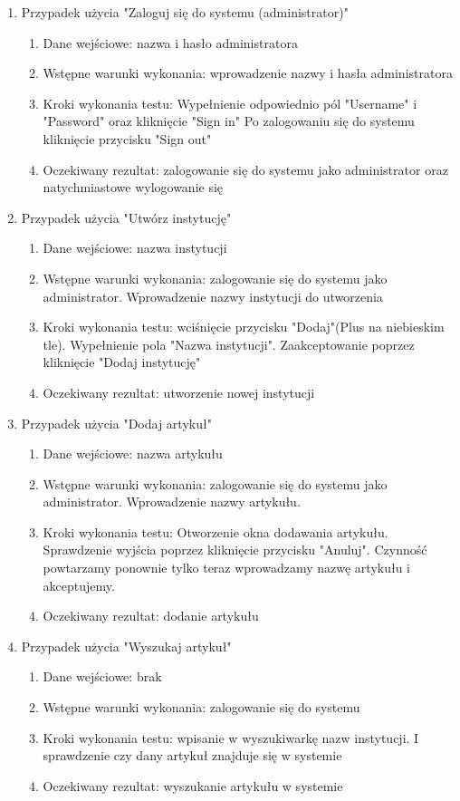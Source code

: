 \documentclass{article}
\begin{document}
	\begin{enumerate}
	\item Przypadek użycia "Zaloguj się do systemu (administrator)"
	\begin{enumerate}
		\item Dane wejściowe: nazwa i hasło administratora
		\item Wstępne warunki wykonania: wprowadzenie nazwy i hasła administratora
		\item Kroki wykonania testu: Wypełnienie odpowiednio pól "Username" i "Password" oraz kliknięcie "Sign in" Po zalogowaniu się do systemu kliknięcie przycisku "Sign out"
		\item Oczekiwany rezultat: zalogowanie się do systemu jako administrator oraz natychmiastowe wylogowanie się
	\end{enumerate}
	\item Przypadek użycia "Utwórz instytucję"
		\begin{enumerate}
		\item Dane wejściowe: nazwa instytucji
		\item Wstępne warunki wykonania: zalogowanie się do systemu jako administrator. Wprowadzenie nazwy instytucji do utworzenia
		\item Kroki wykonania testu: wciśnięcie przycisku "Dodaj"(Plus na niebieskim tle). Wypełnienie pola "Nazwa instytucji". Zaakceptowanie poprzez kliknięcie "Dodaj instytucję"
		\item Oczekiwany rezultat: utworzenie nowej instytucji
		\end{enumerate}
	\item Przypadek użycia "Dodaj artykuł"
		\begin{enumerate}
		\item Dane wejściowe: nazwa artykułu
		\item Wstępne warunki wykonania: zalogowanie się do systemu jako administrator. Wprowadzenie nazwy artykułu.
		\item Kroki wykonania testu: Otworzenie okna dodawania artykułu. Sprawdzenie wyjścia poprzez kliknięcie przycisku "Anuluj". Czynność powtarzamy ponownie tylko teraz wprowadzamy nazwę artykułu i akceptujemy.
		\item Oczekiwany rezultat: dodanie artykułu
		\end{enumerate}
	\item Przypadek użycia "Wyszukaj artykuł"
		\begin{enumerate}
		\item Dane wejściowe: brak
		\item Wstępne warunki wykonania: zalogowanie się do systemu
		\item Kroki wykonania testu: wpisanie w wyszukiwarkę nazw instytucji. I sprawdzenie czy dany artykuł znajduje się w systemie
		\item Oczekiwany rezultat: wyszukanie artykułu w systemie
		\end{enumerate}


\end{enumerate}
\end{document}

